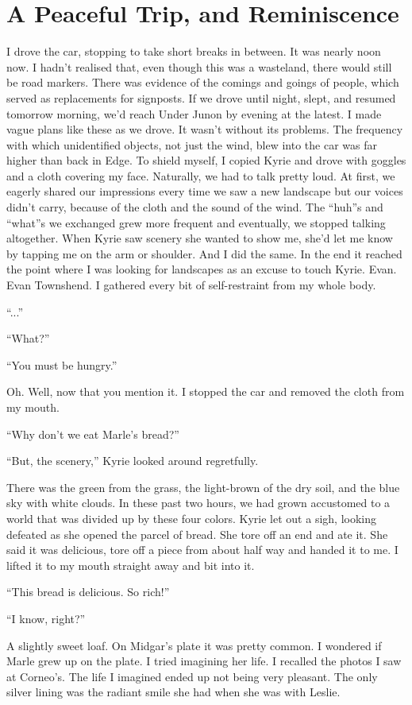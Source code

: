 \documentclass[oneside]{book}
\begin{document}
\chapter{A Peaceful Trip, and Reminiscence}
I drove the car, stopping to take short breaks in between. It was nearly noon now. I hadn’t realised that, even though this was a wasteland, there would still be road markers. There was evidence of the comings and goings of people, which served as replacements for signposts. If we drove until night, slept, and resumed tomorrow morning, we’d reach Under Junon by evening at the latest. I made vague plans like these as we drove. It wasn’t without its problems. The frequency with which unidentified objects, not just the wind, blew into the car was far higher than back in Edge. To shield myself, I copied Kyrie and drove with goggles and a cloth covering my face. Naturally, we had to talk pretty loud. At first, we eagerly shared our impressions every time we saw a new landscape but our voices didn’t carry, because of the cloth and the sound of the wind. The “huh”s and “what”s we exchanged grew more frequent and eventually, we stopped talking altogether. When Kyrie saw scenery she wanted to show me, she’d let me know by tapping me on the arm or shoulder. And I did the same. In the end it reached the point where I was looking for landscapes as an excuse to touch Kyrie. Evan. Evan Townshend. I gathered every bit of self-restraint from my whole body.

“...”

“What?”

“You must be hungry.”

Oh. Well, now that you mention it. I stopped the car and removed the cloth from my mouth.

“Why don’t we eat Marle’s bread?”

“But, the scenery,” Kyrie looked around regretfully.

There was the green from the grass, the light-brown of the dry soil, and the blue sky with white clouds. In these past two hours, we had grown accustomed to a world that was divided up by these four colors. Kyrie let out a sigh, looking defeated as she opened the parcel of bread. She tore off an end and ate it. She said it was delicious, tore off a piece from about half way and handed it to me. I lifted it to my mouth straight away and bit into it.

“This bread is delicious. So rich!”

“I know, right?”

A slightly sweet loaf. On Midgar’s plate it was pretty common. I wondered if Marle grew up on the plate. I tried imagining her life. I recalled the photos I saw at Corneo’s. The life I imagined ended up not being very pleasant. The only silver lining was the radiant smile she had when she was with Leslie.
\end{document}
